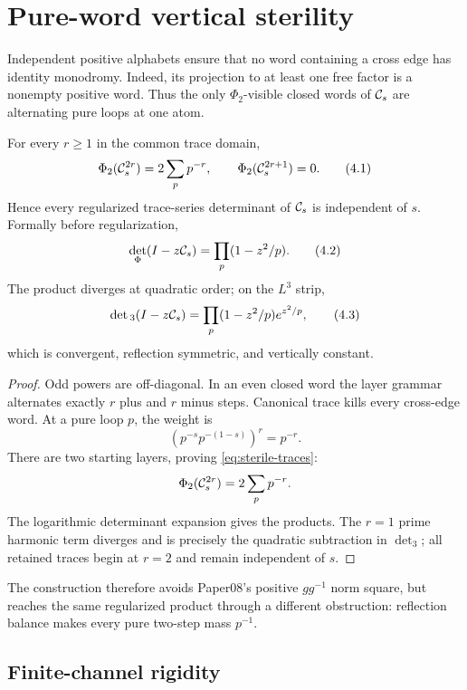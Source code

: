 \section{Pure-word vertical sterility}
\label{sec:rigidity}

Independent positive alphabets ensure that no word containing a cross edge
has identity monodromy.  Indeed, its projection to at least one free factor
is a nonempty positive word.  Thus the only $\Phi_2$-visible closed words of
$\mathcal C_s$ are alternating pure loops at one atom.

\begin{theorem}
\label{thm:sterility}
For every $r\ge1$ in the common trace domain,
\[
 \Phi_2(\mathcal C_s^{2r})=2\sum_pp^{-r},
 \qquad
 \Phi_2(\mathcal C_s^{2r+1})=0.                    \tag{4.1}
\]
Hence every regularized trace-series determinant of $\mathcal C_s$ is independent
of $s$.  Formally before regularization,
\[
 \det_\Phi(I-z\mathcal C_s)=\prod_p(1-z^2/p).       \tag{4.2}
\]
The product diverges at quadratic order; on the $L^3$ strip,
\[
 \det{}_3(I-z\mathcal C_s)
 =\prod_p(1-z^2/p)e^{z^2/p},                 \tag{4.3}
\]
which is convergent, reflection symmetric, and vertically constant.
\end{theorem}

\begin{proof}
Odd powers are off-diagonal.  In an even closed word the layer grammar
alternates exactly $r$ plus and $r$ minus steps.  Canonical trace kills every
cross-edge word.  At a pure loop $p$, the weight is
\[
 (p^{-s}p^{-(1-s)})^r=p^{-r}.
\]
There are two starting layers, proving \cref{eq:sterile-traces}:
\begin{equation}
 \Phi_2(\mathcal C_s^{2r})=2\sum_pp^{-r}.
 \label{eq:sterile-traces}
\end{equation}
The logarithmic determinant expansion gives the products.  The $r=1$ prime
harmonic term diverges and is precisely the quadratic subtraction in
$\det_3$; all retained traces begin at $r=2$ and remain independent of $s$.
\end{proof}

The construction therefore avoids Paper08's positive $gg^{-1}$ norm square,
but reaches the same regularized product through a different obstruction:
reflection balance makes every pure two-step mass $p^{-1}$.

\subsection{Finite-channel rigidity}

